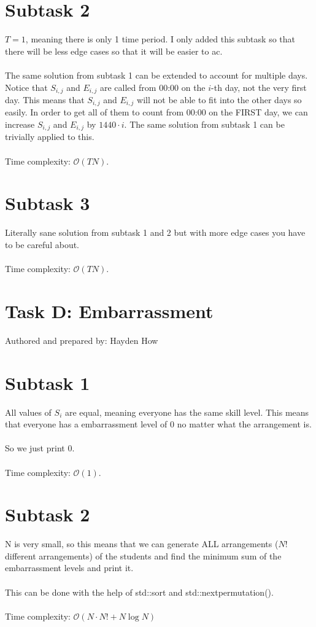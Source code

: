 \documentclass{report}
\begin{document}
\section*{Subtask 2}
$T = 1$, meaning there is only 1 time period. I only added this subtask so that there will be less edge cases so that it will be easier to ac.
\\\\
The same solution from subtask 1 can be extended to account for multiple days. Notice that $S_{i,j}$ and $E_{i,j}$ are called from 00:00 on the $i$-th day, not the very first day. This means that $S_{i,j}$ and $E_{i,j}$ will not be able to fit into the other days so easily. In order to get all of them to count from 00:00 on the FIRST day, we can increase $S_{i,j}$ and $E_{i,j}$ by $1440 \cdot i$. The same solution from subtask 1 can be trivially applied to this.
\\\\
Time complexity: $\mathcal{O}(TN)$.

\section*{Subtask 3}
Literally sane solution from subtask 1 and 2 but with more edge cases you have to be careful about.
\\\\
Time complexity: $\mathcal{O}(TN)$.

\pagebreak
\hfill \break \hfill \break

\section*{Task D: Embarrassment}
Authored and prepared by: Hayden How
\section*{Subtask 1}
All values of $S_i$ are equal, meaning everyone has the same skill level. This means that everyone has a embarrassment level of 0 no matter what the arrangement is.
\\\\
So we just print 0.
\\\\
Time complexity: $\mathcal{O}(1)$.

\section*{Subtask 2}
N is very small, so this means that we can generate ALL arrangements ($N!$ different arrangements) of the students and find the minimum sum of the embarrassment levels and print it.
\\\\
This can be done with the help of std::sort and std::next\textunderscore permutation().
\\\\
Time complexity: $\mathcal{O}(N \cdot N! + N\log{}N)$
\end{document}
